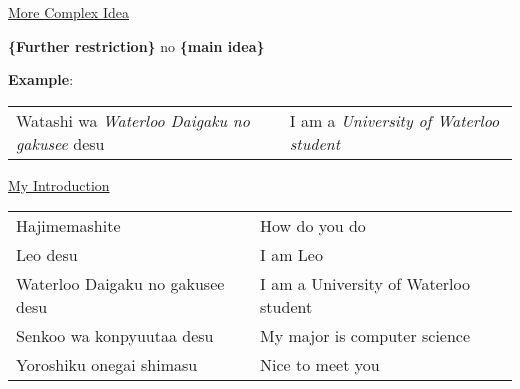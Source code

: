 \documentclass{article}
\begin{document}

\underline{More Complex Idea}

\textbf{\{Further restriction\}} no \textbf{\{main idea\}}

\begin{tcolorbox}
\textbf{Example}:

\begin{tabular}{ l | l }
Watashi wa \textit{Waterloo Daigaku no gakusee} desu & I am a \textit{University of Waterloo student}
\end{tabular}
\end{tcolorbox}


\begin{tcolorbox}[colback=yellow!35!white]
\underline{My Introduction}\\

\begin{tabular}{ l | l }
Hajimemashite & How do you do\\
Leo desu & I am Leo\\
Waterloo Daigaku no gakusee desu & I am a University of Waterloo student\\
Senkoo wa konpyuutaa desu & My major is computer science\\
Yoroshiku onegai shimasu & Nice to meet you\\
\end{tabular}
\end{tcolorbox}
\end{document}
